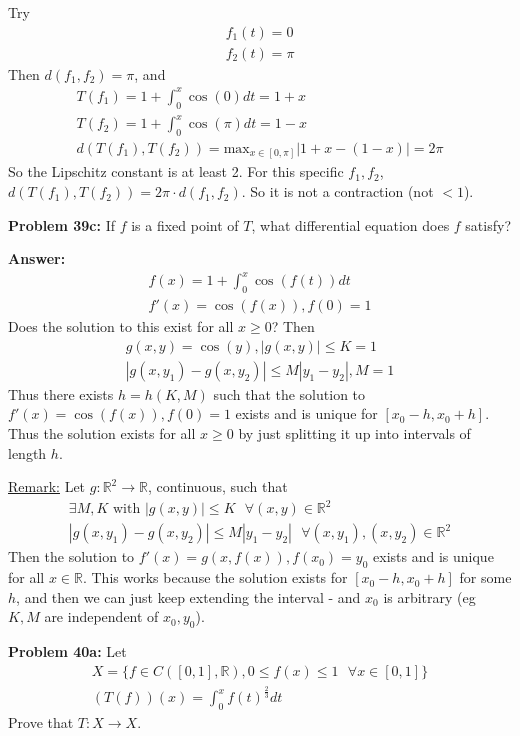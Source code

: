 \documentclass{article}
\newcommand*{\txt}[1]{\text{ #1 }}%
\newcommand*{\fora}{\txt{}\forall}%
\newcommand*{\rr}{\mathbb{R}}%
\begin{document}
Try \begin{align*}
    f_1(t)=0\\
    f_2(t)=\pi
\end{align*} Then $d(f_1,f_2)=\pi$, and \begin{align*}
    T(f_1)=1+\int_{0}^{x}\cos(0)dt=1+x\\
    T(f_2)=1+\int_{0}^{x}\cos(\pi)dt=1-x\\
    d(T(f_1),T(f_2))=\text{max}_{x\in[0,\pi]}|1+x-(1-x)|=2\pi
\end{align*} So the Lipschitz constant is at least 2. For this specific $f_1,f_2$, $d(T(f_1),T(f_2))= 2\pi\cdot d(f_1,f_2)$. So it is not a contraction (not $<1$).

\textbf{Problem 39c:} If $f$ is a fixed point of $T$, what differential equation does $f$ satisfy?

\textbf{Answer:} \begin{align*}
    f(x)=1+\int_{0}^{x}\cos(f(t))dt\\
    f'(x)=\cos(f(x)),f(0)=1
\end{align*}
Does the solution to this exist for all $x\geq 0$? Then \begin{align*}
    g(x,y)=\cos(y), |g(x,y)|\leq K=1\\
    |g(x,y_1)-g(x,y_2)|\leq M|y_1-y_2|, M=1
\end{align*} Thus there exists $h=h(K,M)$ such that the solution to $f'(x)=\cos(f(x)),f(0)=1$ exists and is unique for $[x_0-h,x_0+h]$. Thus the solution exists for all $x\geq 0$ by just splitting it up into intervals of length $h$.

\underline{Remark:} Let $g:\rr^2\to\rr$, continuous, such that \begin{align*}
    \exists M,K\txt{with} |g(x,y)|\leq K\fora (x,y)\in \rr^2\\
    |g(x,y_1)-g(x,y_2)|\leq M|y_1-y_2|\fora (x,y_1),(x,y_2)\in \rr^2
\end{align*} Then the solution to $f'(x)=g(x,f(x)),f(x_0)=y_0$ exists and is unique for all $x\in \rr$. This works because the solution exists for $[x_0-h,x_0+h]$ for some $h$, and then we can just keep extending the interval - and $x_0$ is arbitrary (eg $K,M$ are independent of $x_0,y_0$).

\textbf{Problem 40a:} Let \begin{align*}
    X=\{f\in C([0,1],\rr), 0\leq f(x)\leq 1\fora x\in[0,1]\}\\
    (T(f))(x)=\int_{0}^{x}f(t)^{\frac{2}{3}}dt
\end{align*} Prove that $T:X\to X$.
\end{document}
